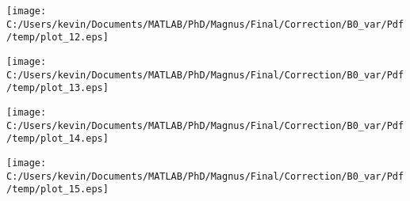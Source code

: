 \begin{landscape}
\texttt{[image: C:/Users/kevin/Documents/MATLAB/PhD/Magnus/Final/Correction/B0\_var/Pdf/temp/plot\_12.eps]}
\end{landscape}
\begin{landscape}
\texttt{[image: C:/Users/kevin/Documents/MATLAB/PhD/Magnus/Final/Correction/B0\_var/Pdf/temp/plot\_13.eps]}
\end{landscape}
\begin{landscape}
\texttt{[image: C:/Users/kevin/Documents/MATLAB/PhD/Magnus/Final/Correction/B0\_var/Pdf/temp/plot\_14.eps]}
\end{landscape}
\begin{landscape}
\texttt{[image: C:/Users/kevin/Documents/MATLAB/PhD/Magnus/Final/Correction/B0\_var/Pdf/temp/plot\_15.eps]}
\end{landscape}

